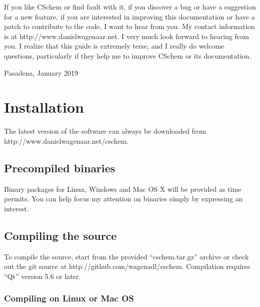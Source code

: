\documentclass[11pt]{report}
\begin{document}
If you like CSchem or find fault with it, if you discover a bug or have a
suggestion for a new feature, if you are interested in improving this
documentation or have a patch to contribute to the code, I want to
hear from you. My contact information is at
http://www.danielwagenaar.net. I very much look forward to hearing
from you. I realize that this guide is extremely terse, and I
really do welcome questions, particularly if they help me to improve
CSchem or its documentation.\bigskip

\noindent Pasadena, January 2019

\chapter{Installation}

The latest version of the software can always be downloaded from\break
http://www.danielwagenaar.net/cschem.

\section{Precompiled binaries}

Binary packages for Linux, Windows and Mac OS X will be provided as time
permits. You can help focus my attention on binaries simply by
expressing an interest.



\section{Compiling the source}
To compile the source,  start from the provided
``cschem.tar.gz'' archive or check out the git source at
http://github.com/wagenadl/cschem. Compilation requires
``Qt'' version 5.6 or later.

\subsection{Compiling on Linux or Mac OS}
\end{document}
